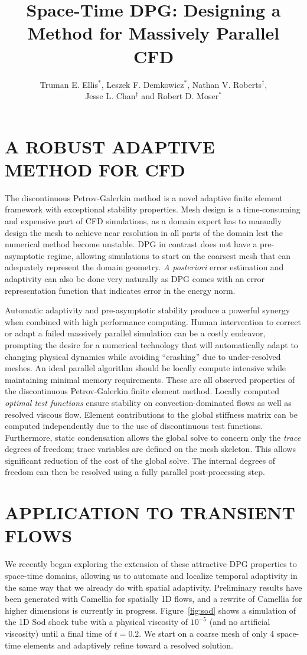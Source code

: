 \documentclass{parcfd2014}
\title{Space-Time DPG: Designing a Method for Massively Parallel CFD}
\author{Truman E. Ellis$^{*}$, Leszek F. Demkowicz$^{*}$, Nathan V. Roberts$^{\dag}$,\\ Jesse L. Chan$^{\ddag}$ and Robert D. Moser$^{*}$}
\begin{document}
\section{A ROBUST ADAPTIVE METHOD FOR CFD}
The discontinuous Petrov-Galerkin method\cite{DPGOverview2} is a novel adaptive finite element framework with exceptional stability properties.
Mesh design is a time-consuming and expensive part of CFD simulations, as a domain expert has to manually design the 
mesh to achieve near resolution in all parts of the domain lest the numerical method become unstable.
DPG in contrast does not have a pre-asymptotic regime, allowing simulations to start on the coarsest mesh that can adequately represent the domain geometry.
\emph{A posteriori} error estimation and adaptivity can also be done very naturally as DPG comes with an error representation function 
that indicates error in the energy norm.

Automatic adaptivity and pre-asymptotic stability produce a powerful synergy when combined with high performance computing.
Human intervention to correct or adapt a failed massively parallel simulation can be a costly endeavor, prompting the desire for a
numerical technology that will automatically adapt to changing physical dynamics while avoiding ``crashing'' due to under-resolved meshes.
An ideal parallel algorithm should be locally compute intensive while maintaining minimal memory requirements.
These are all observed properties of the discontinuous Petrov-Galerkin finite element method.
Locally computed \emph{optimal test functions} ensure stability on convection-dominated flows as well as resolved viscous flow.
Element contributions to the global stiffness matrix can be computed independently due to the use of discontinuous test functions.
Furthermore, static condensation allows the global solve to concern only the \emph{trace} degrees of freedom; 
trace variables are defined on the mesh skeleton.  
This allows significant reduction of the cost of the global solve.  
The internal degrees of freedom can then be resolved using a fully parallel post-processing step.

\section{APPLICATION TO TRANSIENT FLOWS}
We recently began exploring the extension of these attractive DPG properties to space-time domains, allowing us to automate and localize temporal adaptivity
in the same way that we already do with spatial adaptivity. 
Preliminary results have been generated with Camellia\cite{CamelliaDPG} for spatially 1D flows,
and a rewrite of Camellia for higher dimensions is currently in progress.
Figure~\ref{fig:sod} shows a simulation of the 1D Sod shock tube with a physical viscosity of $10^{-5}$ (and no artificial viscosity) 
until a final time of $t=0.2$.
We start on a coarse mesh of only 4 space-time elements and adaptively refine toward a resolved solution.
\end{document}
